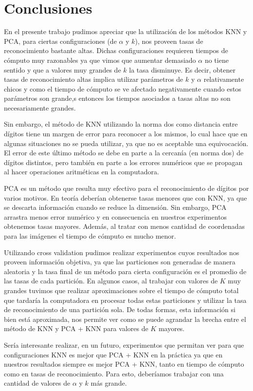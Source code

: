 \section{Conclusiones}

En el presente trabajo pudimos apreciar que la utilización de los métodos KNN y PCA, para ciertas configuraciones (de $\alpha$ y $k$), nos proveen tasas de reconocimiento bastante altas. Dichas configuraciones requieren tiempos de cómputo muy razonables ya que vimos que aumentar demasiado $\alpha$ no tiene sentido y que a valores muy grandes de $k$ la tasa disminuye. Es decir, obtener tasas de reconocimiento altas implica utilizar parámetros de $k$ y $\alpha$ relativamente chicos y como el tiempo de cómputo se ve afectado negativamente cuando estos parámetros son grande,s entonces los tiempos asociados a tasas altas no son necesariamente grandes.

Sin embargo, el método de KNN utilizando la norma dos como distancia entre dígitos tiene un margen de error para reconocer a los mismos, lo cual hace que en algunas situaciones no se pueda utilizar, ya que no es aceptable una equivocación. El error de este último método se debe en parte a la cercanía (en norma dos) de dígitos distintos, pero también en parte a los errores numéricos que se propagan al hacer operaciones aritméticas en la computadora.

PCA es un método que resulta muy efectivo para el reconocimiento de dígitos por varios motivos. En teoría deberían obtenerse tasas menores que con KNN, ya que se descarta información cuando se reduce la dimensión. Sin embargo, PCA arrastra menos error numérico y en consecuencia en nuestros experimentos obtenemos tasas mayores. Además, al tratar con menos cantidad de coordenadas para las imágenes el tiempo de cómputo es mucho menor.

Utilizando cross validation pudimos realizar experimentos cuyos resultados nos proveen información objetiva, ya que las particiones son generadas de manera aleatoria y la tasa final de un método para cierta configuración es el promedio de las tasas de cada partición. En algunos casos, al trabajar con valores de $K$ muy grandes tuvimos que realizar aproximaciones sobre el tiempo de cómputo total que tardaría la computadora en procesar todas estas particiones y utilizar la tasa de reconocimiento de una partición sola. De todas formas, esta información si bien está aproximada, nos permite ver como se puede agrandar la brecha entre el método de KNN y PCA + KNN para valores de $K$ mayores.

Sería interesante realizar, en un futuro, experimentos que permitan ver para que configuraciones KNN es mejor que PCA + KNN en la práctica ya que en nuestros resultados siempre es mejor PCA + KNN, tanto en tiempo de cómputo como en tasas de reconocimiento. Para esto, deberíamos trabajar con una cantidad de valores de $\alpha$ y $k$ más grande.
